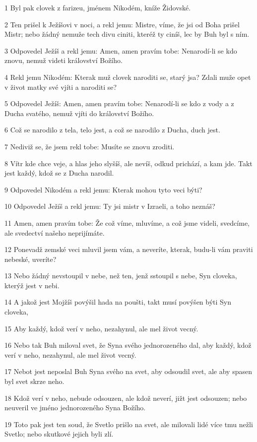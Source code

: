 \par 1 Byl pak clovek z farizeu, jménem Nikodém, kníže Židovské.
\par 2 Ten prišel k Ježíšovi v noci, a rekl jemu: Mistre, víme, že jsi od Boha prišel Mistr; nebo žádný nemuže tech divu ciniti, kteréž ty ciníš, lec by Buh byl s ním.
\par 3 Odpovedel Ježíš a rekl jemu: Amen, amen pravím tobe: Nenarodí-li se kdo znovu, nemuž videti království Božího.
\par 4 Rekl jemu Nikodém: Kterak muž clovek naroditi se, starý jsa? Zdali muže opet v život matky své vjíti a naroditi se?
\par 5 Odpovedel Ježíš: Amen, amen pravím tobe: Nenarodí-li se kdo z vody a z Ducha svatého, nemuž vjíti do království Božího.
\par 6 Což se narodilo z tela, telo jest, a což se narodilo z Ducha, duch jest.
\par 7 Nediviž se, že jsem rekl tobe: Musíte se znovu zroditi.
\par 8 Vítr kde chce veje, a hlas jeho slyšíš, ale nevíš, odkud prichází, a kam jde. Takt jest každý, kdož se z Ducha narodil.
\par 9 Odpovedel Nikodém a rekl jemu: Kterak mohou tyto veci býti?
\par 10 Odpovedel Ježíš a rekl jemu: Ty jsi mistr v Izraeli, a toho neznáš?
\par 11 Amen, amen pravím tobe: Že což víme, mluvíme, a což jsme videli, svedcíme, ale svedectví našeho neprijímáte.
\par 12 Ponevadž zemské veci mluvil jsem vám, a neveríte, kterak, budu-li vám praviti nebeské, uveríte?
\par 13 Nebo žádný nevstoupil v nebe, než ten, jenž sstoupil s nebe, Syn cloveka, kterýž jest v nebi.
\par 14 A jakož jest Mojžíš povýšil hada na poušti, takt musí povýšen býti Syn cloveka,
\par 15 Aby každý, kdož verí v neho, nezahynul, ale mel život vecný.
\par 16 Nebo tak Buh miloval svet, že Syna svého jednorozeného dal, aby každý, kdož verí v neho, nezahynul, ale mel život vecný.
\par 17 Nebot jest neposlal Buh Syna svého na svet, aby odsoudil svet, ale aby spasen byl svet skrze neho.
\par 18 Kdož verí v neho, nebude odsouzen, ale kdož neverí, jižt jest odsouzen; nebo neuveril ve jméno jednorozeného Syna Božího.
\par 19 Toto pak jest ten soud, že Svetlo prišlo na svet, ale milovali lidé více tmu nežli Svetlo; nebo skutkové jejich byli zlí.
